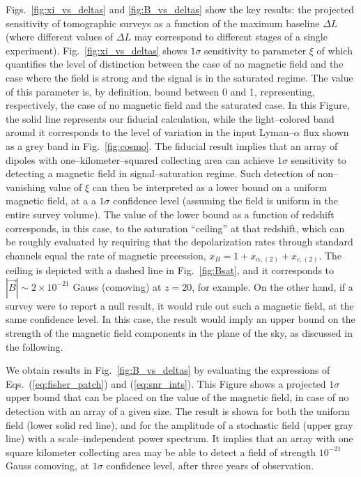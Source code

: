 Figs.~\ref{fig:xi_vs_deltas} and \ref{fig:B_vs_deltas} show the key results: the projected sensitivity of tomographic surveys as a function of the maximum baseline $\Delta L$ (where different values of $\Delta L$ may correspond to different stages of a single experiment). Fig.~\ref{fig:xi_vs_deltas} shows $1\sigma$ sensitivity to parameter $\xi$ of \eq{\ref{eq:saturated_P}} which quantifies the level of distinction between the case of no magnetic field and the case where the field is strong and the signal is in the saturated regime. The value of this parameter is, by definition, bound between 0 and 1, representing, respectively, the case of no magnetic field and the saturated case. In this Figure, the solid line represents our fiducial calculation, while the light--colored band around it corresponds to the level of variation in the input Lyman--$\alpha$ flux shown as a grey band in Fig.~\ref{fig:cosmo}. The fiducial result implies that an array of dipoles with one--kilometer--squared collecting area can achieve $1\sigma$ sensitivity to detecting a magnetic field in signal--saturation regime. Such detection of non--vanishing value of $\xi$ can then be interpreted as a lower bound on a uniform magnetic field, at a a $1\sigma$ confidence level (assuming the field is uniform in the entire survey volume). The value of the lower bound as a function of redshift  corresponds, in this case, to the saturation ``ceiling'' at that redshift, which can be roughly evaluated by requiring that the depolarization rates through standard channels equal the rate of magnetic precession, $x_B = 1+x_{\alpha ,(2)} +x_{c,(2)}$. The ceiling is depicted with a dashed line in Fig.~\ref{fig:Bsat}, and it corresponds to $|\vec B|\sim 2\times 10^{-21}$ Gauss (comoving) at $z=20$, for example.  On the other hand, if a survey were to report a null result, it would rule out such a magnetic field, at the same confidence level. In this case, the result would imply an upper bound on the strength of the magnetic field components in the plane of the sky, as discussed in the following. 

We obtain results in Fig.~\ref{fig:B_vs_deltas} by evaluating the expressions of Eqs.~(\ref{eq:fisher_patch}) and (\ref{eq:snr_ints}). This Figure shows a projected $1\sigma$ upper bound that can be placed on the value of the magnetic field, in case of no detection with an array of a given size. The result is shown for both the uniform field (lower solid red line), and for the amplitude of a stochastic field (upper gray line) with a scale--independent power spectrum. It implies that an array with one square kilometer collecting area may be able to detect a field of strength $10^{-21}$ Gauss comoving, at $1\sigma$ confidence level, after three years of observation.

